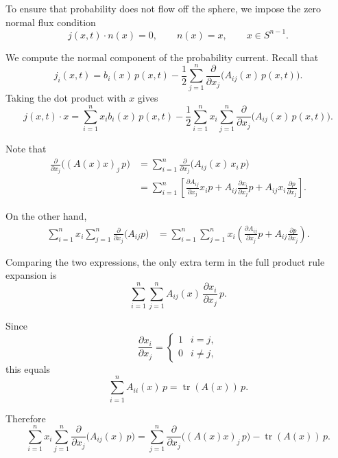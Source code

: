 \documentclass[11pt]{article}
\begin{document}
To ensure that probability does not flow off the sphere, we impose the zero normal flux condition
\begin{equation}
j(x,t)\cdot n(x) = 0,
\qquad n(x)=x,
\qquad x\in S^{n-1}.
\end{equation}



We compute the normal component of the probability current. Recall that
\begin{equation}
j_i(x,t)
=
b_i(x)\,p(x,t)
-
\frac12 \sum_{j=1}^n
\frac{\partial}{\partial x_j}
\big( A_{ij}(x)\,p(x,t) \big).
\end{equation}
Taking the dot product with $x$ gives
\begin{equation}
j(x,t)\cdot x
=
\sum_{i=1}^n x_i b_i(x)\,p(x,t)
-
\frac12
\sum_{i=1}^n
x_i
\sum_{j=1}^n
\frac{\partial}{\partial x_j}
\big( A_{ij}(x)\,p(x,t) \big).
\end{equation}


Note that 
\begin{align}
\frac{\partial}{\partial x_j}
\big( (A(x)x)_j\,p \big)
&=
\sum_{i=1}^n
\frac{\partial}{\partial x_j}
\big( A_{ij}(x)\,x_i\,p \big) \\
&=
\sum_{i=1}^n
\left[
\frac{\partial A_{ij}}{\partial x_j} x_i p
+
A_{ij} \frac{\partial x_i}{\partial x_j} p
+
A_{ij} x_i \frac{\partial p}{\partial x_j}
\right].
\end{align}

On the other hand,
\begin{align}
\sum_{i=1}^n x_i
\sum_{j=1}^n
\frac{\partial}{\partial x_j}
\big( A_{ij} p \big)
&=
\sum_{i=1}^n
\sum_{j=1}^n
x_i
\left(
\frac{\partial A_{ij}}{\partial x_j} p
+
A_{ij} \frac{\partial p}{\partial x_j}
\right).
\end{align}

Comparing the two expressions, the only extra term in the full product rule expansion is
\[
\sum_{i=1}^n
\sum_{j=1}^n
A_{ij}(x)\,
\frac{\partial x_i}{\partial x_j}\,p.
\]

Since
\[
\frac{\partial x_i}{\partial x_j}
=
\begin{cases}
1 & i=j, \\
0 & i\ne j,
\end{cases}
\]
this equals
\begin{equation}
\sum_{i=1}^n A_{ii}(x)\,p
=
\operatorname{tr}(A(x))\,p.
\end{equation}

Therefore
\begin{equation}
\sum_{i=1}^n
x_i
\sum_{j=1}^n
\frac{\partial}{\partial x_j}
\big( A_{ij}(x)\,p \big)
=
\sum_{j=1}^n
\frac{\partial}{\partial x_j}
\big( (A(x)x)_j\,p \big)
-
\operatorname{tr}(A(x))\,p.
\end{equation}
\end{document}
